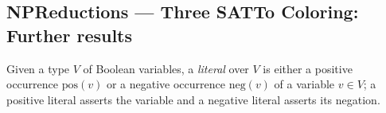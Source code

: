 \subsection*{NPReductions --- Three SATTo Coloring: Further results}

\begin{definition}
\label{SATtoColor.Literal}
\leanok
Given a type $V$ of Boolean variables, a \emph{literal} over $V$ is either a
positive occurrence $\mathrm{pos}(v)$ or a negative occurrence
$\mathrm{neg}(v)$ of a variable $v \in V$; a positive literal asserts the
variable and a negative literal asserts its negation.
\end{definition}
